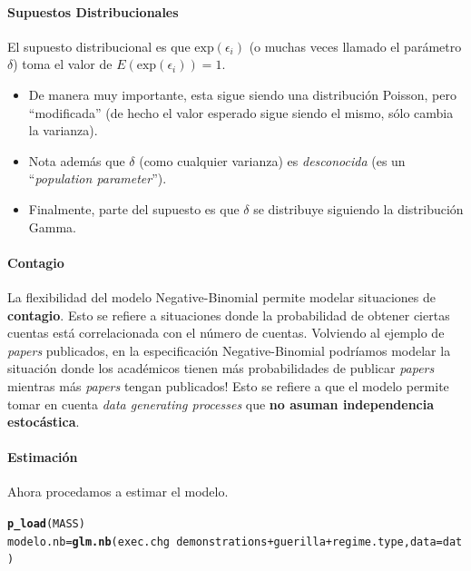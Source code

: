 \documentclass[onesided]{article}\usepackage[]{graphicx}\usepackage[]{color}
\makeatletter
\newcommand{\hlopt}[1]{\textcolor[rgb]{0,0,0}{#1}}%
\newcommand{\hlstd}[1]{\textcolor[rgb]{0.345,0.345,0.345}{#1}}%
\newcommand{\hlkwb}[1]{\textcolor[rgb]{0.69,0.353,0.396}{#1}}%
\newcommand{\hlkwc}[1]{\textcolor[rgb]{0.333,0.667,0.333}{#1}}%
\newcommand{\hlkwd}[1]{\textcolor[rgb]{0.737,0.353,0.396}{\textbf{#1}}}%
\newenvironment{kframe}{%
 \def\at@end@of@kframe{}%
 \ifinner\ifhmode%
  \def\at@end@of@kframe{\end{minipage}}%
  \begin{minipage}{\columnwidth}%
 \fi\fi%
 \def\FrameCommand##1{\hskip\@totalleftmargin \hskip-\fboxsep
 \colorbox{shadecolor}{##1}\hskip-\fboxsep
     \hskip-\linewidth \hskip-\@totalleftmargin \hskip\columnwidth}%
 \MakeFramed {\advance\hsize-\width
   \@totalleftmargin\z@ \linewidth\hsize
   \@setminipage}}%
 {\par\unskip\endMakeFramed%
 \at@end@of@kframe}
\newenvironment{knitrout}{}{} %
\makeatother
\begin{document}
\paragraph{Supuestos Distribucionales} El supuesto distribucional es que $\text{exp}(\epsilon_{i})$ (o muchas veces llamado el par\'ametro $\delta$)  toma el valor de $E(\text{exp}(\epsilon_{i}))=1$. 

\begin{itemize}
\item De manera muy importante, esta sigue siendo una distribuci\'on Poisson, pero ``modificada'' (de hecho el valor esperado sigue siendo el mismo, s\'olo cambia la varianza). 
\item Nota adem\'as que $\delta$ (como cualquier varianza) es \emph{desconocida} (es un ``\emph{population parameter}''). 
\item Finalmente, parte del supuesto es que $\delta$ se distribuye siguiendo la distribuci\'on Gamma.
\end{itemize}

\paragraph{Contagio} La flexibilidad del modelo Negative-Binomial permite modelar situaciones de {\bf contagio}. Esto se refiere a situaciones donde la probabilidad de obtener ciertas cuentas est\'a correlacionada con el n\'umero de cuentas. Volviendo al ejemplo de \emph{papers} publicados, en la especificaci\'on Negative-Binomial podr\'iamos modelar la situaci\'on donde los acad\'emicos tienen m\'as probabilidades de publicar \emph{papers} mientras m\'as \emph{papers} tengan publicados! Esto se refiere a que el modelo permite tomar en cuenta \emph{data generating processes} que {\bf no asuman independencia estoc\'astica}.

\paragraph{Estimaci\'on}  Ahora procedamos a estimar el modelo.

\begin{knitrout}
\color{fgcolor}\begin{kframe}
\begin{alltt}
\hlkwd{p_load}\hlstd{(MASS)}
\hlstd{modelo.nb} \hlkwb{=} \hlkwd{glm.nb}\hlstd{(exec.chg} \hlopt{~} \hlstd{demonstrations} \hlopt{+} \hlstd{guerilla} \hlopt{+} \hlstd{regime.type,} \hlkwc{data}\hlstd{=dat)}
\end{alltt}
\end{kframe}
\end{knitrout}
\end{document}
